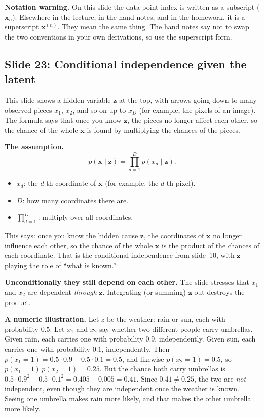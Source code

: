 \textbf{Notation warning.} On this slide the data point index is written as a subscript ($\mathbf{x}_n$). Elsewhere in the lecture, in the hand notes, and in the homework, it is a superscript $\mathbf{x}^{(n)}$. They mean the same thing. The hand notes say not to swap the two conventions in your own derivations, so use the superscript form.

\subsection*{Slide 23: Conditional independence given the latent}

This slide shows a hidden variable $\mathbf{z}$ at the top, with arrows going down to many observed pieces $x_1$, $x_2$, and so on up to $x_D$ (for example, the pixels of an image). The formula says that once you know $\mathbf{z}$, the pieces no longer affect each other, so the chance of the whole $\mathbf{x}$ is found by multiplying the chances of the pieces.

\textbf{The assumption.}
\[
p(\mathbf{x}\mid\mathbf{z})=\prod_{d=1}^{D}p(x_d\mid\mathbf{z}).
\]
\begin{itemize}
\item $x_d$: the $d$-th coordinate of $\mathbf{x}$ (for example, the $d$-th pixel).
\item $D$: how many coordinates there are.
\item $\prod_{d=1}^{D}$: multiply over all coordinates.
\end{itemize}
This says: once you know the hidden cause $\mathbf{z}$, the coordinates of $\mathbf{x}$ no longer influence each other, so the chance of the whole $\mathbf{x}$ is the product of the chances of each coordinate. That is the conditional independence from slide~10, with $\mathbf{z}$ playing the role of ``what is known.''

\textbf{Unconditionally they still depend on each other.} The slide stresses that $x_1$ and $x_2$ are dependent \textit{through} $\mathbf{z}$. Integrating (or summing) $\mathbf{z}$ out destroys the product.

\textbf{A numeric illustration.} Let $z$ be the weather: rain or sun, each with probability $0.5$. Let $x_1$ and $x_2$ say whether two different people carry umbrellas. Given rain, each carries one with probability $0.9$, independently. Given sun, each carries one with probability $0.1$, independently. Then $p(x_1=1)=0.5\cdot0.9+0.5\cdot0.1=0.5$, and likewise $p(x_2=1)=0.5$, so $p(x_1=1)\,p(x_2=1)=0.25$. But the chance both carry umbrellas is $0.5\cdot0.9^2+0.5\cdot0.1^2=0.405+0.005=0.41$. Since $0.41\neq0.25$, the two are \textit{not} independent, even though they are independent once the weather is known. Seeing one umbrella makes rain more likely, and that makes the other umbrella more likely.

